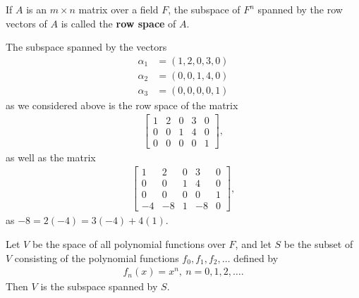 \documentclass[12pt]{article}
\begin{document}
\begin{defn}
  If $A$ is an $m \times n$ matrix over a field $F$, the subspace of $F^{n}$ spanned
  by the row vectors of $A$ is called the \textbf{row space} of $A$.
\end{defn}

\begin{exm}
  The subspace spanned by the vectors
  \begin{align*}
    \alpha_1 &= (1,2,0,3,0)\\
    \alpha_2 &= (0,0,1,4,0)\\
    \alpha_3 &= (0,0,0,0,1)
  \end{align*}
  as we considered above is the row space of the matrix
  \begin{align*}
    \begin{bmatrix}
      1 & 2 & 0 & 3 & 0\\
      0 & 0 & 1 & 4 & 0\\
      0 & 0 & 0 & 0 & 1
    \end{bmatrix},
  \end{align*}
  as well as the matrix
  \begin{align*}
    \begin{bmatrix}
      1  & 2  & 0 & 3  & 0\\
      0  & 0  & 1 & 4  & 0\\
      0  & 0  & 0 & 0  & 1\\
      -4 & -8 & 1 & -8 & 0
    \end{bmatrix},
  \end{align*}
  as $-8 = 2(-4) = 3(-4) + 4(1)$.
\end{exm}

\begin{exm}
  Let $V$ be the space of all polynomial functions over $F$, and let $S$ be the
  subset of $V$ consisting of the polynomial functions $f_0,f_1,f_2,\ldots$ defined
  by
  \begin{align*}
    f_n(x) = x^n,\ n = 0,1,2,\ldots.
  \end{align*}
  Then $V$ is the subspace spanned by $S$.
\end{exm}
\end{document}
